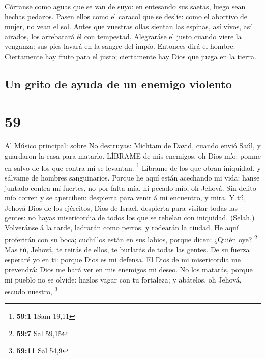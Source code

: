  Córranse como aguas que se van de suyo: en entesando sus
saetas, luego sean hechas pedazos.  Pasen ellos como el
caracol que se deslíe: como el abortivo de mujer, no vean el sol.
 Antes que vuestras ollas sientan las espinas, así vivos,
así airados, los arrebatará él con tempestad.  Alegraráse
el justo cuando viere la venganza: sus pies lavará en la sangre del
impío.  Entonces dirá el hombre: Ciertamente hay fruto para
el justo; ciertamente hay Dios que juzga en la tierra.

\hypertarget{un-grito-de-ayuda-de-un-enemigo-violento}{%
\subsection{Un grito de ayuda de un enemigo
violento}\label{un-grito-de-ayuda-de-un-enemigo-violento}}

\hypertarget{section-58}{%
\section{59}\label{section-58}}

 Al Músico principal: sobre No destruyas: Michtam de David,
cuando envió Saúl, y guardaron la casa para matarlo. LÍBRAME de mis
enemigos, oh Dios mío: ponme en salvo de los que contra mí se levantan.
\footnote{\textbf{59:1} 1Sam 19,11}  Líbrame de los que
obran iniquidad, y sálvame de hombres sanguinarios.  Porque
he aquí están acechando mi vida: hanse juntado contra mí fuertes, no por
falta mía, ni pecado mío, oh Jehová.  Sin delito mío corren
y se aperciben: despierta para venir á mi encuentro, y mira.
 Y tú, Jehová Dios de los ejércitos, Dios de Israel,
despierta para visitar todas las gentes: no hayas misericordia de todos
los que se rebelan con iniquidad. (Selah.)  Volveránse á la
tarde, ladrarán como perros, y rodearán la ciudad.  He aquí
proferirán con su boca; cuchillos están en sus labios, porque dicen:
¿Quién oye? \footnote{\textbf{59:7} Sal 59,15}  Mas tú,
Jehová, te reirás de ellos, te burlarás de todas las gentes.
 De su fuerza esperaré yo en ti: porque Dios es mi defensa.
 El Dios de mi misericordia me prevendrá: Dios me hará ver
en mis enemigos mi deseo.  No los matarás, porque mi pueblo
no se olvide: hazlos vagar con tu fortaleza; y abátelos, oh Jehová,
escudo nuestro, \footnote{\textbf{59:11} Sal 54,9}

